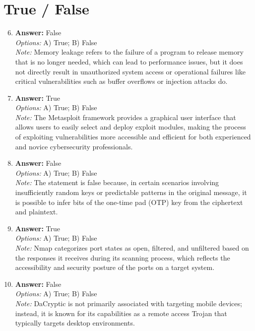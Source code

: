 \documentclass[12pt]{article}
\begin{document}
\section*{True / False}
\begin{enumerate}[label=\arabic*.]
\setcounter{enumi}{5}
\item \textbf{Answer:} False
\\ \textit{Options:} A) True; B) False
\\ \textit{Note:} Memory leakage refers to the failure of a program to release memory that is no longer needed, which can lead to performance issues, but it does not directly result in unauthorized system access or operational failures like critical vulnerabilities such as buffer overflows or injection attacks do.
\item \textbf{Answer:} True
\\ \textit{Options:} A) True; B) False
\\ \textit{Note:} The Metasploit framework provides a graphical user interface that allows users to easily select and deploy exploit modules, making the process of exploiting vulnerabilities more accessible and efficient for both experienced and novice cybersecurity professionals.
\item \textbf{Answer:} False
\\ \textit{Options:} A) True; B) False
\\ \textit{Note:} The statement is false because, in certain scenarios involving insufficiently random keys or predictable patterns in the original message, it is possible to infer bits of the one-time pad (OTP) key from the ciphertext and plaintext.
\item \textbf{Answer:} True
\\ \textit{Options:} A) True; B) False
\\ \textit{Note:} Nmap categorizes port states as open, filtered, and unfiltered based on the responses it receives during its scanning process, which reflects the accessibility and security posture of the ports on a target system.
\item \textbf{Answer:} False
\\ \textit{Options:} A) True; B) False
\\ \textit{Note:} DaCryptic is not primarily associated with targeting mobile devices; instead, it is known for its capabilities as a remote access Trojan that typically targets desktop environments.
\end{enumerate}
\end{document}
